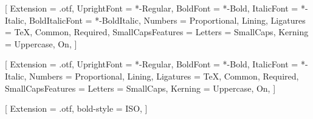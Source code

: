 
\setmainfont{LibertinusSerif}[%
	Extension         = .otf,
	UprightFont       = *-Regular,
	BoldFont          = *-Bold,
	ItalicFont        = *-Italic,
	BoldItalicFont    = *-BoldItalic,
	Numbers           = {Proportional, Lining},
	Ligatures         = {TeX, Common, Required},
	SmallCapsFeatures = {Letters = SmallCaps},
	Kerning           = {Uppercase, On},
]%

\setsansfont{LibertinusSans}[%
	Extension         = .otf,
	UprightFont       = *-Regular,
	BoldFont          = *-Bold,
	ItalicFont        = *-Italic,
	Numbers           = {Proportional, Lining},
	Ligatures         = {TeX, Common, Required},
	SmallCapsFeatures = {Letters = SmallCaps},
	Kerning           = {Uppercase, On},
]%


\setmonofont{Latin Modern Mono}



[%
	Extension  = .otf,
	bold-style = ISO, %
]%


